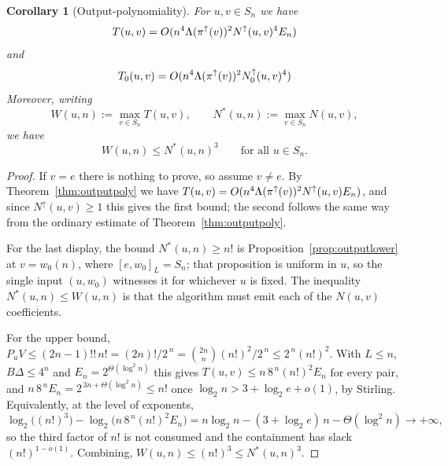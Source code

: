 \documentclass{amsart}
\newtheorem{corollary}[lemma]{Corollary}
\theoremstyle{definition}
\theoremstyle{remark}
\numberwithin{equation}{section}
\DeclareMathOperator{\sch}{\mathfrak{S}}
\begin{document}
\begin{corollary}[Output-polynomiality] \label{cor:outputpoly}
  For $u,v\in S_n$ we have
  $$T(u,v)=O(n^{4}\Lambda(\pi^\uparrow(v))^2N^\uparrow(u,v)^4E_n)$$
  and
  $$T_0(u,v)=O(n^{4}\Lambda(\pi^\uparrow(v))^2N_0^\uparrow(u,v)^4)$$
Moreover, writing
$$W(u,n):=\max_{v\in S_n}T(u,v),\qquad N^{*}(u,n):=\max_{v\in S_n}N(u,v),$$
we have
$$W(u,n)\leq N^{*}(u,n)^{3}\qquad\text{for all }u\in S_n.$$
\end{corollary}
\begin{proof}
If $v=e$ there is nothing to prove, so assume $v\neq e$. By Theorem~\ref{thm:outputpoly} we have $T(u,v)=O(n^{4}\Lambda(\pi^\uparrow(v))^2N^\uparrow(u,v)E_n)$, and since $N^\uparrow(u,v)\geq 1$ this gives the first bound; the second follows the same way from the ordinary estimate of Theorem~\ref{thm:outputpoly}.

For the last display, the bound $N^{*}(u,n)\geq n!$ is Proposition~\ref{prop:outputlower} at $v=w_0(n)$, where $[e,w_0]_L=S_n$; that proposition is uniform in $u$, so the single input $(u,w_0)$ witnesses it for whichever $u$ is fixed. The inequality $N^{*}(u,n)\leq W(u,n)$ is that the algorithm must emit each of the $N(u,v)$ coefficients.

For the upper bound, $P_uV\leq(2n-1)!!\,n!=(2n)!/2^{\,n}=\binom{2n}{n}(n!)^2/2^{\,n}\leq 2^{\,n}(n!)^2$. With $L\leq n$, $B\Delta\leq 4^n$ and $E_n=2^{\Theta(\log^2 n)}$ this gives $T(u,v)\leq n\,8^{\,n}(n!)^2E_n$ for every pair, and $n\,8^{\,n}E_n=2^{\,3n+\Theta(\log^2 n)}\leq n!$ once $\log_2 n>3+\log_2 e+o(1)$, by Stirling. Equivalently, at the level of exponents,
$$\log_2\bigl((n!)^3\bigr)-\log_2\bigl(n\,8^{\,n}(n!)^2E_n\bigr)=n\log_2 n-(3+\log_2 e)\,n-\Theta(\log^2 n)\longrightarrow+\infty,$$
so the third factor of $n!$ is not consumed and the containment has slack $(n!)^{1-o(1)}$. Combining, $W(u,n)\leq(n!)^3\leq N^{*}(u,n)^3$.
\end{proof}
\end{document}
